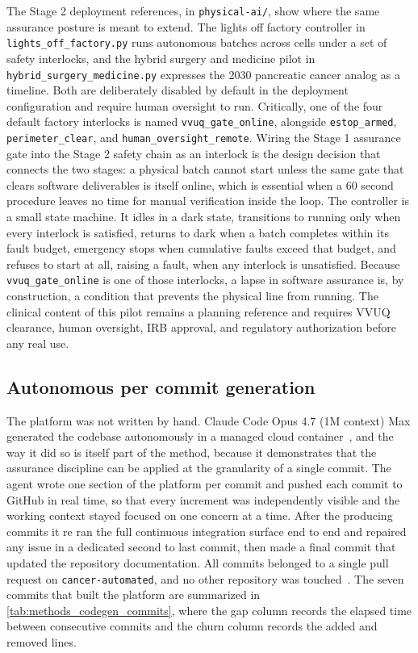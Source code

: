 The Stage 2 deployment references, in \texttt{physical-ai/}, show where the same
assurance posture is meant to extend. The lights off factory controller in
\texttt{lights\_off\_factory.py} runs autonomous batches across cells under a set
of safety interlocks, and the hybrid surgery and medicine pilot in
\texttt{hybrid\_surgery\_medicine.py} expresses the 2030 pancreatic cancer analog
as a timeline. Both are deliberately disabled by default in the deployment
configuration and require human oversight to run. Critically, one of the four
default factory interlocks is named \texttt{vvuq\_gate\_online}, alongside
\texttt{estop\_armed}, \texttt{perimeter\_clear}, and
\texttt{human\_oversight\_remote}. Wiring the Stage 1 assurance gate into the
Stage 2 safety chain as an interlock is the design decision that connects the two
stages: a physical batch cannot start unless the same gate that clears software
deliverables is itself online, which is essential when a 60 second procedure
leaves no time for manual verification inside the loop. The controller is a small
state machine. It idles in a dark state, transitions to running only when every
interlock is satisfied, returns to dark when a batch completes within its fault
budget, emergency stops when cumulative faults exceed that budget, and refuses to
start at all, raising a fault, when any interlock is unsatisfied. Because
\texttt{vvuq\_gate\_online} is one of those interlocks, a lapse in software
assurance is, by construction, a condition that prevents the physical line from
running. The clinical content of this pilot remains a planning reference and requires VVUQ clearance, human
oversight, IRB approval, and regulatory authorization before any real use.

\subsection{Autonomous per commit generation}

The platform was not written by hand. Claude Code Opus 4.7 (1M context) Max
generated the codebase autonomously in a managed cloud
container~\cite{anthropicopus47, anthropicclaudecodeweb}, and the way it did so
is itself part of the method, because it demonstrates that the assurance
discipline can be applied at the granularity of a single commit. The agent wrote
one section of the platform per commit and pushed each commit to GitHub in real
time, so that every increment was independently visible and the working context
stayed focused on one concern at a time. After the producing commits it re ran
the full continuous integration surface end to end and repaired any issue in a
dedicated second to last commit, then made a final commit that updated the
repository documentation. All commits belonged to a single pull request on
\texttt{cancer-automated}, and no other repository was touched~\cite{repo-cancer-automated}.
The seven commits that built the platform are summarized in
\autoref{tab:methods_codegen_commits}, where the gap column records the elapsed
time between consecutive commits and the churn column records the added and
removed lines.

